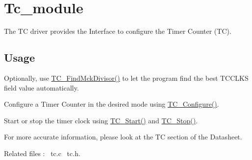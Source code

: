 \hypertarget{group__tc__module}{}\section{Tc\+\_\+module}
\label{group__tc__module}
The TC driver provides the Interface to configure the Timer Counter (TC).\hypertarget{group__RTEMSBSPsARM_Usage}{}\subsection{Usage}\label{group__RTEMSBSPsARM_Usage}

\begin{DoxyItemize}
\item Optionally, use \mbox{\hyperlink{tc_8c_ab49a1357d43f97cfc7846ddef6c1b470}{T\+C\+\_\+\+Find\+Mck\+Divisor()}} to let the program find the best T\+C\+C\+L\+KS field value automatically. 
\item Configure a Timer Counter in the desired mode using \mbox{\hyperlink{tc_8c_a4f65db5c58b90e03f0b358cb0385db43}{T\+C\+\_\+\+Configure()}}. 
\item Start or stop the timer clock using \mbox{\hyperlink{tc_8c_af895f2ccec86be21d6126d5d55a54db2}{T\+C\+\_\+\+Start()}} and \mbox{\hyperlink{tc_8c_a2e06b3996c83626aa426b09ba647e65d}{T\+C\+\_\+\+Stop()}}.


\end{DoxyItemize}For more accurate information, please look at the TC section of the Datasheet.

Related files \+:~\newline
tc.\+c~\newline
 tc.\+h.~\newline
 
